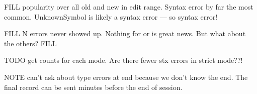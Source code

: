 \documentclass[english,submission,cleveref]{programming}
\begin{document}
FILL popularity over all old and new in edit range.
Syntax error by far the most common.
UnknownSymbol is likely a syntax error --- so  syntax error!

FILL N errors never showed up.
Nothing for  or  is great news.
But what about the others? FILL

TODO get counts for each mode. Are there fewer stx errors in strict mode??!

NOTE can't ask about type errors at end because we don't know
the end.
The final record can be sent minutes before the end of session.


\begin{table}[t]\centering


\end{table}
\end{document}
